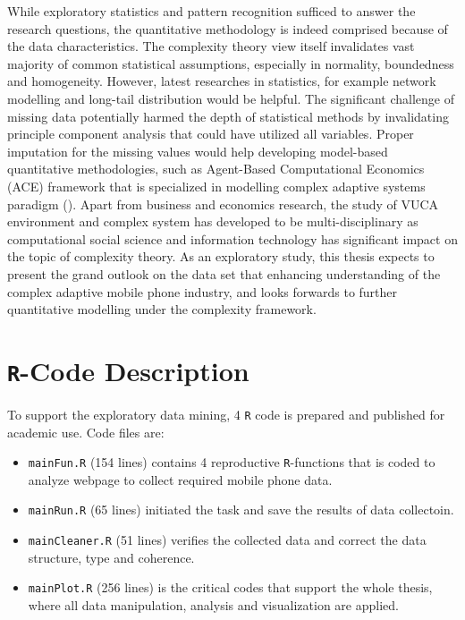 \documentclass[utf8,english]{gradu3}
\begin{document}
While exploratory statistics and pattern recognition sufficed to answer the research questions, the quantitative methodology is indeed comprised because of the data characteristics. The complexity theory view itself invalidates vast majority of common statistical assumptions, especially in normality, boundedness and homogeneity. However, latest researches in statistics, for example network modelling and long-tail distribution would be helpful. The significant challenge of missing data potentially harmed the depth of statistical methods by invalidating principle component analysis that could have utilized all variables. Proper imputation for the missing values would help developing model-based quantitative methodologies, such as Agent-Based Computational Economics (ACE) framework that is specialized in modelling complex adaptive systems paradigm (\cite{tesfatsion2003agent}). Apart from business and economics research, the study of VUCA environment and complex system has developed to be multi-disciplinary as computational social science and information technology has significant impact on the topic of complexity theory. As an exploratory study, this thesis expects to present the grand outlook on the data set that enhancing understanding of the complex adaptive mobile phone industry, and looks forwards to further quantitative modelling under the complexity framework.

\printbibliography

\appendix

\section{\texttt{R}-Code Description}
\label{app:rcode}
To support the exploratory data mining, 4 \texttt{R} code is prepared and published for academic use. Code files are:

\begin{itemize}
\item \texttt{mainFun.R} (154 lines) contains 4 reproductive \texttt{R}-functions that is coded to analyze webpage to collect required mobile phone data.
\item \texttt{mainRun.R} (65 lines) initiated the task and save the results of data collectoin.
\item \texttt{mainCleaner.R} (51 lines) verifies the collected data and correct the data structure, type and coherence.
\item \texttt{mainPlot.R} (256 lines) is the critical codes that support the whole thesis, where all data manipulation, analysis and visualization are applied.
\end{itemize}
\end{document}
